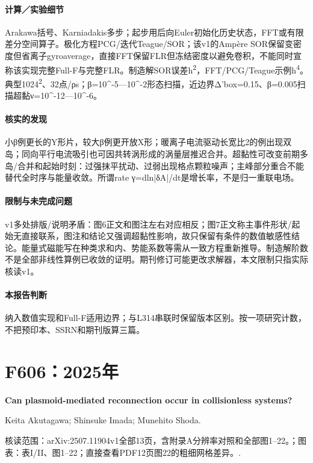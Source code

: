 \paragraph{计算／实验细节}Arakawa括号、Karniadakis多步；起步用后向Euler初始化历史状态，FFT或有限差分空间算子。极化方程PCG/迭代Teague/SOR；该v1的Ampère SOR保留变密度但省离子gyroaverage，直接FFT保留FLR但冻结密度以避免卷积，不能同时宣称该实现完整Full-F与完整FLR。制造解SOR误差h\textsuperscript{2}，FFT/PCG/Teague示例h\textsuperscript{4}。典型1024\textsuperscript{2}、32点/ρs；β=10\textasciicircum{}-5—10\textasciicircum{}-2形态扫描，近边界Δ'box=0.15、β=0.005扫描超黏ν=10\textasciicircum{}-12—10\textasciicircum{}-6。

\paragraph{核实的发现}小β例更长的Y形片，较大β例更开放X形；暖离子电流驱动长宽比2的例出现双岛；同向平行电流吸引也可因共转涡形成的涡量层推迟合并。超黏性可改变前期多岛/合并和起始时刻：过强抹平扰动、过弱出现格点颗粒噪声；主峰部分重合不能替代全时序与能量收敛。所谓rate γ=dln|δA|/dt是增长率，不是归一重联电场。

\paragraph{限制与未完成问题}v1多处排版/说明矛盾：图6正文和图注左右对应相反；图7正文称主事件形状/起始无直接联系，图注和结论又强调超黏性影响，故只保留有条件的数值敏感性结论。能量式磁能写在种类求和内、势能系数等需从一致方程重新推导。制造解阶数不是全部非线性算例已收敛的证明。期刊修订可能更改求解器，本文限制只指实际核读v1。

\paragraph{本报告判断}纳入数值实现和Full-F适用边界；与L314串联时保留版本区别。按一项研究计数，不把预印本、SSRN和期刊版算三篇。

\section{F606：2025年}\label{paper:F606}

\textbf{Can plasmoid-mediated reconnection occur in collisionless systems?}\citep{F606}\

Keita Akutagawa;  Shinsuke Imada;  Munehito Shoda.

\textsf{核读范围：}arXiv:2507.11904v1全部13页，含附录A分辨率对照和全部图1–22。；\textsf{图表：}表I/II、图1–22；直接查看PDF12页图22的粗细网格差异。.

